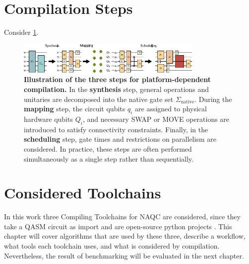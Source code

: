 \section{Compilation Steps}
Consider \ref{fig:compilation_steps}.
\begin{figure}[htbp]
  \centering
    \includegraphics[width=0.8\textwidth]{figures/compilation_steps.pdf}
    \caption[Illustration of the three steps for platform-dependent compilation]{\textbf{Illustration of the three steps for platform-dependent compilation.} In the \textbf{synthesis} step, general operations and unitaries are decomposed into the native gate set $\Sigma_{\mathrm{native}}$.
  During the \textbf{mapping} step, the circuit qubits $q_{i}$ are assigned to physical hardware qubits $Q_{i}$, and necessary SWAP or MOVE operations are introduced to satisfy connectivity constraints.
  Finally, in the \textbf{scheduling} step, gate times and restrictions on parallelism are considered.
  In practice, these steps are often performed simultaneously as a single step rather than sequentially. \parencite{Schmid_2024_NeutralAtomBasics}}
    \label{fig:compilation_steps}
\end{figure}

\section{Considered Toolchains}
In this work three Compiling Toolchains for \ac{NAQC} are considered, 
since they take a QASM circuit as import and are open-source python projects \parencite{Tan_2025_Enola,schmid2023hybridcircuitmappingleveraging,huang2025dasatomdivideandshuttleatomapproach}.
This chapter will cover algorithms that are used by these three, 
describe a workflow, what tools each toolchain uses, and what is considered by compilation.
Nevertheless, the result of benchmarking will be evaluated in the next chapter.

